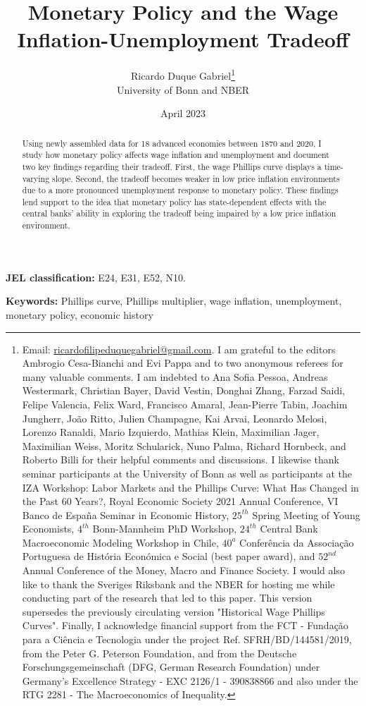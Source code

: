 \documentclass[12pt]{article}
\title{\textbf{Monetary Policy and the Wage Inflation-Unemployment Tradeoff}}
\author{Ricardo Duque Gabriel\footnote{\scriptsize Email: \href{mailto:ricardofilipeduquegabriel@gmail.com}{ricardofilipeduquegabriel@gmail.com}. I am grateful to the editors Ambrogio Cesa-Bianchi and Evi Pappa and to two anonymous referees for many valuable comments. I am indebted to Ana Sofia Pessoa, Andreas Westermark, Christian Bayer, David Vestin, Donghai Zhang, Farzad Saidi, Felipe Valencia, Felix Ward, Francisco Amaral, Jean-Pierre Tabin, Joachim Jungherr, João Ritto, Julien Champagne, Kai Arvai, Leonardo Melosi, Lorenzo Ranaldi, Mario Izquierdo, Mathias Klein, Maximilian Jager, Maximilian Weiss, Moritz Schularick, Nuno Palma, Richard Hornbeck, and Roberto Billi for their helpful comments and discussions. I likewise thank seminar participants at the University of Bonn as well as participants at the IZA Workshop: Labor Markets and the Phillips Curve: What Has Changed in the Past 60 Years?, Royal Economic Society 2021 Annual Conference, VI Banco de España Seminar in Economic History, $25^{th}$ Spring Meeting of Young Economists, $4^{th}$ Bonn-Mannheim PhD Workshop, $24^{th}$ Central Bank Macroeconomic Modeling Workshop in Chile, $40^a$ Conferência da Associação Portuguesa de História Económica e Social (best paper award), and $52^{nd}$ Annual Conference of the Money, Macro and Finance Society. I would also like to thank the Sveriges Riksbank and the NBER for hosting me while conducting part of the research that led to this paper. This version supersedes the previously circulating version "Historical Wage Phillips Curves". Finally, I acknowledge financial support from the FCT - Fundação para a Ciência e Tecnologia under the project Ref. SFRH/BD/144581/2019, from the Peter G. Peterson Foundation, and from the Deutsche Forschungsgemeinschaft (DFG, German Research Foundation) under Germany's Excellence Strategy - EXC 2126/1 - 390838866 and also under the RTG 2281 - The Macroeconomics of Inequality.}\\ University of Bonn and NBER}
\date{April 2023}
\begin{document}
\begin{titlepage}

\thispagestyle{empty}
\maketitle

\begin{abstract}
\normalsize Using newly assembled data for 18 advanced economies between 1870 and 2020, I study how monetary policy affects wage inflation and unemployment and document two key findings regarding their tradeoff. First, the wage Phillips curve displays a time-varying slope. Second, the tradeoff becomes weaker in low price inflation environments due to a more pronounced unemployment response to monetary policy. These findings lend support to the idea that monetary policy has state-dependent effects with the central banks' ability in exploring the tradeoff being impaired by a low price inflation environment.


\end{abstract}

\vspace{1em}

\textbf{JEL classification:} E24, E31, E52, N10. 

\vspace{1em}

\textbf{Keywords:} Phillips curve, Phillips multiplier, wage inflation, unemployment, monetary policy, economic history 

\end{titlepage}
\end{document}
